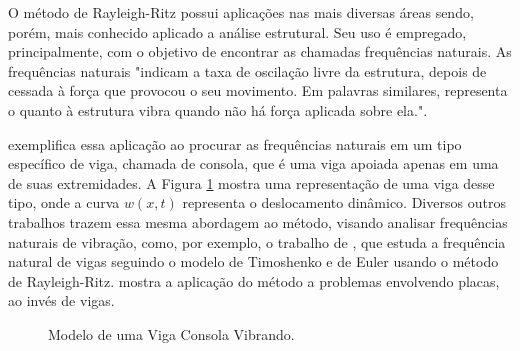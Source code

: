 \documentclass[
	12pt,				%
	openright,			%
    twoside,			%
	a4paper,			%
	english,			%
	french,				%
	spanish,			%
	brazil				%
	]{abntex2}
\numberwithin{lema}{chapter}
\numberwithin{teorema}{chapter}
\numberwithin{definicao}{chapter}
\numberwithin{exemplo}{chapter}
\numberwithin{figure}{chapter}
\begin{document}
O método de Rayleigh-Ritz possui aplicações nas mais diversas áreas sendo, porém, mais conhecido aplicado a análise estrutural. Seu uso é empregado, principalmente, com o objetivo de encontrar as chamadas frequências naturais. As frequências naturais "indicam a taxa de oscilação livre da estrutura, depois de cessada à força que provocou o seu movimento. Em palavras similares, representa o quanto à estrutura vibra quando não há força aplicada sobre ela."\text{ }\cite[p. 1]{Vasquez2015}.

 exemplifica essa aplicação ao procurar as frequências naturais em um tipo específico de viga, chamada de consola, que é uma viga apoiada apenas em uma de suas extremidades. A Figura \ref{fig:cantilever} mostra uma representação de uma viga desse tipo, onde a curva $w(x,t)$ representa o deslocamento dinâmico. Diversos outros trabalhos trazem essa mesma abordagem ao método, visando analisar frequências naturais de vibração, como, por exemplo, o trabalho de , que estuda a frequência natural de vigas seguindo o modelo de Timoshenko e de Euler usando o método de Rayleigh-Ritz.  mostra a aplicação do método a problemas envolvendo placas, ao invés de vigas.

\begin{figure}[h]
	\caption{Modelo de uma Viga Consola Vibrando.}
	\centering
	\label{fig:cantilever}
\end{figure}
\end{document}

